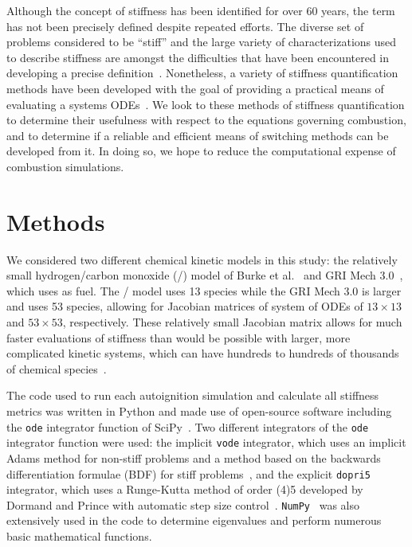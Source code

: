 \documentclass[12pt]{ussci}
\begin{document}
Although the concept of stiffness has been identified for over 60 years, the term has not been precisely defined despite repeated efforts.
The diverse set of problems considered to be ``stiff'' and the large variety of characterizations used to describe stiffness are amongst the difficulties that have been encountered in developing a precise definition~\cite{Soderlind2014}.
Nonetheless, a variety of stiffness quantification methods have been developed with the goal of providing a practical means of evaluating a systems ODEs~\cite{Soderlind2014,Shampine1985,Brugnano2011,Lambert1973ComputationalEquations,Hairer1996SolvingII}.
We look to these methods of stiffness quantification to determine their usefulness with respect to the equations governing combustion, and to determine if a reliable and efficient means of switching methods can be developed from it.
In doing so, we hope to reduce the computational expense of combustion simulations.

\section{Methods}
We considered two different chemical kinetic models in this study: the relatively small hydrogen\slash carbon monoxide (\slash {}) model of Burke et al.~\cite{Burke:2011fh} and GRI Mech 3.0~\cite{grimech3}, which uses  as fuel.
The \slash {} model uses 13 species while the GRI Mech 3.0 is larger and uses 53 species, allowing for Jacobian matrices of system of ODEs of $13 \times 13$ and $53 \times 53$, respectively.
These relatively small Jacobian matrix allows for much faster evaluations of stiffness than would be possible with larger, more complicated kinetic systems, which can have hundreds to hundreds of thousands of chemical species~\cite{Niemeyer:2013}.

The code used to run each autoignition simulation and calculate all stiffness metrics was written in Python and made use of open-source software including the \texttt{ode} integrator function of SciPy~\cite{SciPy}.
Two different integrators of the \texttt{ode} integrator function were used: the implicit \texttt{vode} integrator, which uses an implicit Adams method for non-stiff problems and a method based on the backwards differentiation formulae (BDF) for stiff problems~\cite{Brown1989}, and the explicit \texttt{dopri5} integrator, which uses a Runge-Kutta method of order (4)5 developed by Dormand and Prince with automatic step size control~\cite{E.HairerSPNorsett1990}.
\texttt{NumPy}~\cite{VanDerWalt2011} was also extensively used in the code to determine eigenvalues and perform numerous basic mathematical functions.
\end{document}
